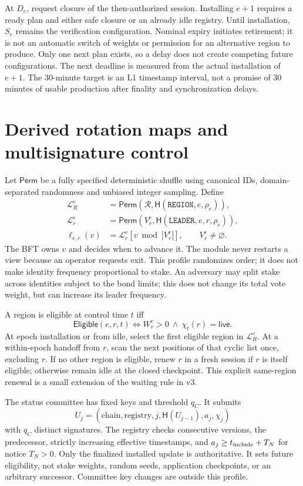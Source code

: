 \documentclass[11pt,a4paper]{article}
\newcommand{\Tag}[1]{\ensuremath{\mathsf{#1}}}
\newcommand{\Proc}[1]{\mathsf{#1}}
\newcommand{\Hash}{\mathsf H}
\begin{document}
At $D_e$, request closure of the then-authorized session. Installing $e+1$
requires a ready plan and either safe closure or an already idle registry.
Until installation, $S_e$ remains the verification configuration.
Nominal expiry initiates retirement; it is not an automatic switch of
weights or permission for an alternative region to produce. Only one
next plan exists, so a delay does not create competing future configurations.
The next deadline is measured from the actual installation of $e+1$.
The 30-minute target is an L1 timestamp interval, not a promise of
30 minutes of usable production after finality and synchronization delays.

\section{Derived rotation maps and multisignature control}
\label{sec:maps}

Let $\Proc{Perm}$ be a fully specified deterministic shuffle using canonical
IDs, domain-separated randomness and unbiased integer sampling. Define
\[
\begin{aligned}
\mathcal L_R^e&=\Proc{Perm}(\mathcal R,
 \Hash(\texttt{REGION},e,\rho_e)),\\
\mathcal L_r^e&=\Proc{Perm}(V_r^e,
 \Hash(\texttt{LEADER},e,r,\rho_e)),\\
\ell_{e,r}(v)&=\mathcal L_r^e[v\bmod |V_r^e|],\qquad V_r^e\ne\varnothing.
\end{aligned}
\]
The BFT owns $v$ and decides when to advance it. The module never restarts
a view because an operator requests exit. This profile randomizes order;
it does not make identity frequency proportional to stake. An adversary
may split stake across identities subject to the bond limits; this does
not change its total vote weight, but can increase its leader frequency.

A region is eligible at control time $t$ iff
\[
\Proc{Eligible}(e,r,t)\iff W_r^e>0\ \land\ \chi_t(r)=\Tag{live}.
\]
At epoch installation or from idle, select the first eligible region in
$\mathcal L_R^e$. At a within-epoch handoff from $r$, scan the next positions
of that cyclic list once, excluding $r$. If no other region is eligible,
renew $r$ in a fresh session if $r$ is itself eligible; otherwise remain
idle at the closed checkpoint. This explicit same-region renewal is a
small extension of the waiting rule in v3.

The status committee has fixed keys and threshold $q_C$. It submits
\[
U_j=(\text{chain},\text{registry},j,\Hash(U_{j-1}),a_j,\chi_j)
\]
with $q_C$ distinct signatures. The registry checks consecutive versions,
the predecessor, strictly increasing effective timestamps, and
$a_j\ge t_{\rm include}+T_N$ for notice $T_N>0$.
Only the finalized installed update is authoritative. It sets future
eligibility, not stake weights, random seeds, application checkpoints, or
an arbitrary successor. Committee key changes are outside this profile.
\end{document}
